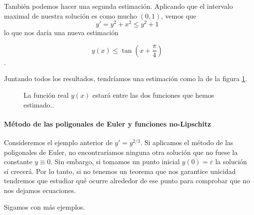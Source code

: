 \documentclass[nochap]{apuntes}
\begin{document}
\begin{example}
También podemos hacer una segunda estimación. Aplicando que el intervalo maximal de nuestra solución es como  mucho $(0,1)$, vemos que
\[ 
y' = y^2 + x^2 ≤ y^2 + 1
\]
lo que nos daría una nueva estimación

\[ y(x) ≤ \tan\left(x + \frac{π}{4}\right) \].

Juntando todos los resultados, tendríamos una estimación como la de la figura \ref{imgEstRegion}.

\begin{figure}[hbtp]
\centering
{}
\caption{La función real $y(x)$ estará entre las dos funciones que hemos estimado..}
\label{imgEstRegion}
\end{figure}
\end{example}

\paragraph{Método de las poligonales de Euler y funciones no-Lipschitz} Consideremos el ejemplo anterior de $y'=y^{2/3}$. Si aplicamos el método de las poligonales de Euler, no encontraríamos ninguna otra solución que no fuese la constante $y\equiv 0$. Sin embargo, si tomamos un punto inicial $y(0) = ε$ la solución sí crecerá. Por lo tanto, si no tenemos un teorema que nos garantice unicidad tendremos que estudiar qué ocurre alrededor de ese punto para comprobar que no nos dejamos ecuaciones.

Sigamos con más ejemplos.
\end{document}
